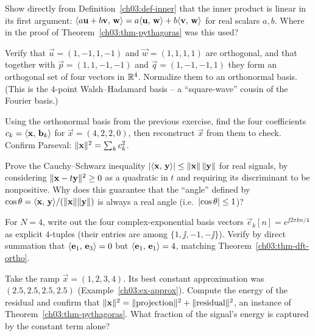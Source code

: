 \begin{exercise}
Show directly from Definition~\ref{ch03:def-inner} that the inner product is linear in its first
argument: $\langle a\mathbf{u}+b\mathbf{v},\, \mathbf{w} \rangle = a\langle \mathbf{u},\, \mathbf{w} \rangle + b\langle \mathbf{v},\, \mathbf{w} \rangle$
for real scalars $a,b$. Where in the proof of Theorem~\ref{ch03:thm-pythagoras} was this used?
\end{exercise}

\begin{exercise}
Verify that $\vec{u}=(1,-1,1,-1)$ and $\vec{w}=(1,1,1,1)$ are orthogonal, and that together with
$\vec{p}=(1,1,-1,-1)$ and $\vec{q}=(1,-1,-1,1)$ they form an orthogonal set of four vectors in
$\mathbb{R}^4$. Normalize them to an orthonormal basis. (This is the $4$-point Walsh--Hadamard basis -- a
``square-wave'' cousin of the Fourier basis.)
\end{exercise}

\begin{exercise}
Using the orthonormal basis from the previous exercise, find the four coefficients $c_k =
\langle \mathbf{x},\, \mathbf{b}_k \rangle$ for $\vec{x}=(4,2,2,0)$, then reconstruct $\vec{x}$ from them to check.
Confirm Parseval: $\lVert\mathbf{x}\rVert^2 = \sum_k c_k^2$.
\end{exercise}

\begin{exercise}
Prove the Cauchy--Schwarz inequality $\lvert\langle \mathbf{x},\, \mathbf{y} \rangle\rvert \le \lVert\mathbf{x}\rVert\,
\lVert\mathbf{y}\rVert$ for real signals, by considering $\lVert\mathbf{x}-t\mathbf{y}\rVert^2 \ge 0$ as a quadratic in
$t$ and requiring its discriminant to be nonpositive. Why does this guarantee that the ``angle''
defined by $\cos\theta = \langle \mathbf{x},\, \mathbf{y} \rangle/(\lVert\mathbf{x}\rVert\lVert\mathbf{y}\rVert)$ is always a real
angle (i.e.\ $\lvert\cos\theta\rvert\le 1$)?
\end{exercise}

\begin{exercise}
For $N=4$, write out the four complex-exponential basis vectors $\vec{e}_k[n]=e^{\jj 2\pi kn/4}$ as
explicit $4$-tuples (their entries are among $\{1,\jj,-1,-\jj\}$). Verify by direct summation that
$\langle \mathbf{e}_1,\, \mathbf{e}_3 \rangle=0$ but $\langle \mathbf{e}_1,\, \mathbf{e}_1 \rangle=4$, matching
Theorem~\ref{ch03:thm-dft-ortho}.
\end{exercise}

\begin{exercise}
Take the ramp $\vec{x}=(1,2,3,4)$. Its best constant approximation was $(2.5,2.5,2.5,2.5)$
(Example~\ref{ch03:ex-approx}). Compute the energy of the residual and confirm that
$\lVert\mathbf{x}\rVert^2 = \lVert\text{projection}\rVert^2 + \lVert\text{residual}\rVert^2$, an instance of
Theorem~\ref{ch03:thm-pythagoras}. What fraction of the signal's energy is captured by the constant
term alone?
\end{exercise}

